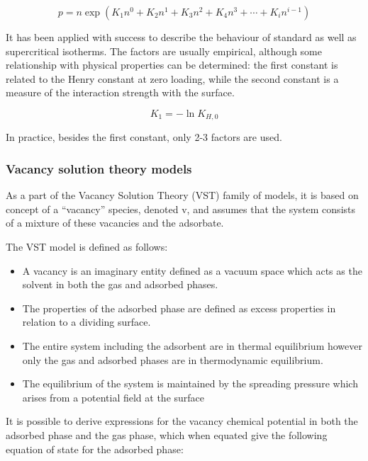 \begin{equation}\label{pyg:eqn:virial}
	p = n \exp{(K_1n^0 + K_2n^1 + K_3n^2 + K_4n^3 + \cdots + K_i
		n^{i-1})}
\end{equation}

It has been applied with success to describe the behaviour of
standard as
well as supercritical isotherms. The factors are usually empirical,
although some relationship with physical properties can be
determined:
the first constant is related to the Henry constant at zero loading,
while
the second constant is a measure of the interaction strength with the
surface.

\begin{equation}
	K_1 = -\ln{K_{H,0}}
\end{equation}

In practice, besides the first constant, only 2-3 factors are used.

\subsubsection{Vacancy solution theory models}\label{pyg:models:vst}

As a part of the Vacancy Solution Theory (VST) family of models, it
is based on concept
of a “vacancy” species, denoted v, and assumes that the system
consists of a
mixture of these vacancies and the adsorbate.

The VST model is defined as follows:

\begin{itemize}

	\item A vacancy is an imaginary entity defined as a vacuum
	      space
	      which acts as the solvent in both the gas and adsorbed
	      phases.
	\item The properties of the adsorbed phase are defined as
	      excess properties
	      in relation to a dividing surface.
	\item The entire system including the adsorbent are in
	      thermal equilibrium
	      however only the gas and adsorbed phases are in
	      thermodynamic equilibrium.
	\item The equilibrium of the system is maintained by the
	      spreading pressure
	      which arises from a potential field at the surface

\end{itemize}

It is possible to derive expressions for the vacancy chemical
potential in both
the adsorbed phase and the gas phase, which when equated give the
following equation
of state for the adsorbed phase:

